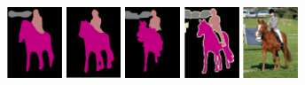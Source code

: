 \begin{figure} %
	\begin{subfigure}{0.55\textwidth}
		\centering
		 \\
		\includegraphics[width=0.18\textwidth]{figures/demo_images/result/compare/my_horse.pdf}
		\includegraphics[width=0.18\textwidth]{figures/demo_images/result/compare/fcn_horse.png}
		\includegraphics[width=0.18\textwidth]{figures/demo_images/result/compare/sds_horse.png}
		\includegraphics[width=0.18\textwidth]{figures/demo_images/result/compare/gt_horse.pdf}
		\includegraphics[width=0.18\textwidth]{figures/demo_images/result/compare/im_horse.pdf}
		\\

\end{subfigure}
\end{figure}
